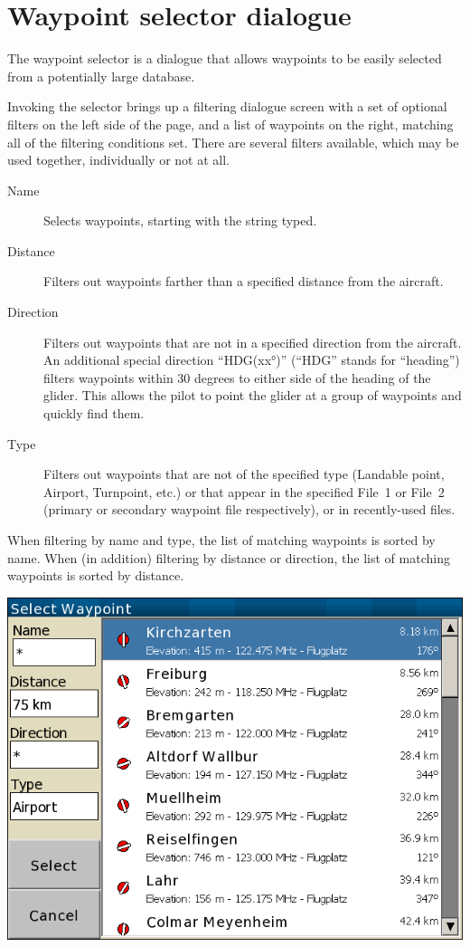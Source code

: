 \section{Waypoint selector dialogue}\label{sec:waypoint-selector-dialog}

The waypoint selector is a dialogue that allows waypoints to be easily selected
from a potentially large database. 

Invoking the selector brings up a filtering dialogue screen with a set of 
optional filters on the left side of the page, and a list of waypoints on the
right, matching all of the filtering conditions set.
There are several filters available, which may be used together,
individually or not at all.
\begin{description}
\item[Name] Selects waypoints, starting with the string typed.
\item[Distance] Filters out waypoints farther than a specified distance from the 
  aircraft.
\item[Direction] Filters out waypoints that are not in a specified direction 
  from the aircraft. 
  An additional special direction ``HDG(xx°)'' (``HDG'' stands for ``heading'') filters waypoints within 30
  degrees to either side of the heading of the glider.  This allows the pilot 
  to point the glider at a group of waypoints and quickly find them.
\item[Type] Filters out waypoints that are not of the specified type
(Landable point, Airport, Turnpoint, etc.) or that appear in the specified File~1 or
File~2 (primary or secondary waypoint file respectively), or in recently-used files.
\end{description}
When filtering by name and type, the list of matching waypoints is
sorted by name. When (in addition) filtering by distance or direction,
 the list of matching waypoints is sorted by distance.

\begin{center}
\includegraphics[angle=0,width=0.8\linewidth,keepaspectratio='true']{figures/dialog-waypointselect.png}
\end{center}

